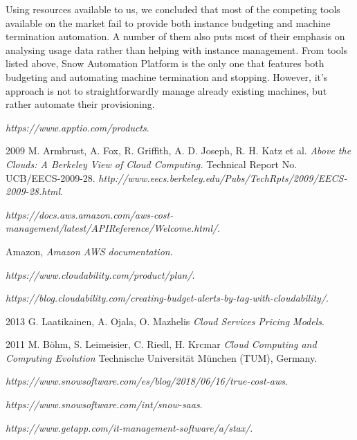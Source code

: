 \documentclass[licencjacka,en]{thesisclass}
\begin{document}
    Using resources available to us, we concluded that most of the competing tools available on the market
    fail to provide both instance budgeting and machine termination automation.
    A number of them also puts most of their emphasis on analysing usage data rather than
    helping with instance management.
    From tools listed above, Snow Automation Platform is the only one that features both budgeting and automating
    machine termination and stopping.
    However, it's approach is not to straightforwardly manage already existing machines,
    but rather automate their provisioning.



    \begin{thebibliography}{99}

        \textit{https://www.apptio.com/products}.

        2009 M. Armbrust, A. Fox, R. Griffith, A. D. Joseph, R. H. Katz et al.
        \textit{Above the Clouds: A Berkeley View of Cloud Computing.}
        Technical Report No. UCB/EECS-2009-28.
        \textit{http://www.eecs.berkeley.edu/Pubs/TechRpts/2009/EECS-2009-28.html}.

        \textit{https://docs.aws.amazon.com/aws-cost-management/latest/APIReference/Welcome.html/}.

        Amazon,
        \textit{Amazon AWS documentation}.

        \textit{https://www.cloudability.com/product/plan/}.

        \textit{https://blog.cloudability.com/creating-budget-alerts-by-tag-with-cloudability/}.

        2013 G. Laatikainen, A. Ojala, O. Mazhelis
        \textit{Cloud Services Pricing Models}.

        2011 M. Böhm, S. Leimeisier, C. Riedl, H. Krcmar
        \textit{Cloud Computing and Computing Evolution}
        Technische Universität München (TUM), Germany.

        \textit{https://www.snowsoftware.com/es/blog/2018/06/16/true-cost-aws}.

        \textit{https://www.snowsoftware.com/int/snow-saas}.

        \textit{https://www.getapp.com/it-management-software/a/stax/}.

    \end{thebibliography}
\end{document}
